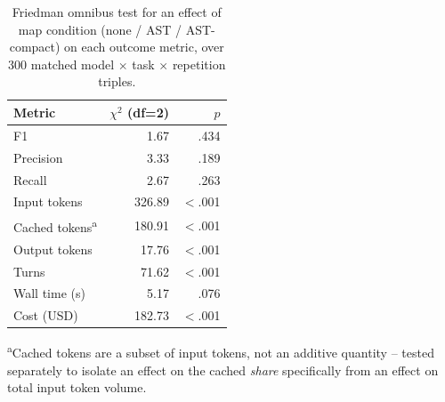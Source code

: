 
\begin{table}[htbp]
\centering
\caption{Friedman omnibus test for an effect of map condition (none / AST / AST-compact) on each outcome metric, over 300 matched model $\times$ task $\times$ repetition triples.}
\label{tab:map-comparison-friedman}
\begin{tabular}{@{}l r r@{}}
\toprule
Metric & $\chi^2$ (df=2) & $p$ \\
\midrule
F1                    & 1.67   & .434 \\
Precision              & 3.33   & .189 \\
Recall                 & 2.67   & .263 \\
\addlinespace
Input tokens            & 326.89 & $<$.001 \\
Cached tokens\textsuperscript{a} & 180.91 & $<$.001 \\
Output tokens           & 17.76  & $<$.001 \\
\addlinespace
Turns                   & 71.62  & $<$.001 \\
Wall time (s)           & 5.17   & .076 \\
Cost (USD)              & 182.73 & $<$.001 \\
\bottomrule
\end{tabular}

\vspace{4pt}
\footnotesize\textsuperscript{a}Cached tokens are a subset of input tokens, not an additive quantity -- tested separately to isolate an effect on the cached \emph{share} specifically from an effect on total input token volume.
\end{table}
